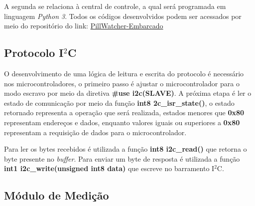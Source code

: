 A segunda se relaciona à central de controle, a qual será programada em linguagem \textit{Python 3}. Todos os códigos desenvolvidos podem ser acessados por meio do repositório do link: \href{https://github.com/PillWatcher/pillwatcher-embarcado}{PillWatcher-Embarcado}

\subsection{Protocolo I$^2$C}

O desenvolvimento de uma lógica de leitura e escrita do protocolo é necessário nos microcontroladores, o primeiro passo é ajustar o microcontrolador para o modo escravo por meio da diretiva \textbf{\#use i2c(SLAVE)}. A próxima etapa é ler o estado de comunicação por meio da função \textbf{int8 2c\_isr\_state()}, o estado retornado representa a operação que será realizada, estados menores que \textbf{0x80} representam endereços e dados, enquanto valores iguais ou superiores a \textbf{0x80} representam a requisição de dados para o microcontrolador.

Para ler os bytes recebidos é utilizada a função \textbf{int8 i2c\_read()} que retorna o byte presente no \textit{buffer}. Para enviar um byte de resposta é utilizada a função \textbf{int1 i2c\_write(unsigned int8 data)} que escreve no barramento I$^2$C.

\subsection{Módulo de Medição}

